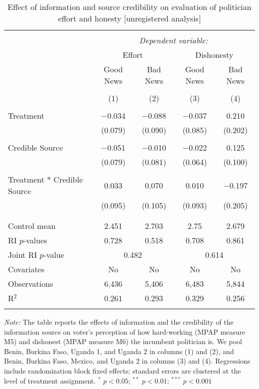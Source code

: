 
\begin{table}[!htbp] \centering 
  \caption{Effect of information and source credibility on evaluation of politician effort and honesty [unregistered analysis]} 
  \label{effort_honesty_credibility} 
\begin{tabular}{@{\extracolsep{1pt}}lcccc} 
\\[-1.8ex]\hline 
\hline \\[-1.8ex] 
 & \multicolumn{4}{c}{\textit{Dependent variable:}} \\ 
\cline{2-5} 
& \multicolumn{2}{c}{Effort}&\multicolumn{2}{c}{Dishonesty}\\
\cline{2-5}
 & Good News & Bad News & Good News & Bad News \\ 
\\[-1.8ex] & (1) & (2) & (3) & (4)\\ 
\hline \\[-1.8ex] 
 Treatment & $-$0.034 & $-$0.088 & $-$0.037 & 0.210 \\ 
  & (0.079) & (0.090) & (0.085) & (0.202) \\ 
  & & & & \\ 
 Credible Source & $-$0.051 & $-$0.010 & $-$0.022 & 0.125 \\ 
  & (0.079) & (0.081) & (0.064) & (0.100) \\ 
  & & & & \\ 
 Treatment * Credible Source & 0.033 & 0.070 & 0.010 & $-$0.197 \\ 
  & (0.095) & (0.105) & (0.093) & (0.205) \\ 
  & & & & \\ 
\hline \\[-1.8ex] 
Control mean & 2.451 & 2.703 & 2.75 & 2.679 \\ 
RI $p$-values & 0.728 & 0.518 & 0.708 & 0.861 \\ 
Joint RI $p$-value & \multicolumn{2}{c}{0.482} & \multicolumn{2}{c}{0.614} \\
Covariates & No & No & No & No \\ 
Observations & 6,436 & 5,406 & 6,483 & 5,844 \\ 
R$^{2}$ & 0.261 & 0.293 & 0.329 & 0.256 \\ 
\hline 
\hline \\[-1.8ex] 
\end{tabular} 
\begin{flushleft}\textit{Note:} The table reports the effects of information and the credibility of the information source on voter's perception of how hard-working (MPAP measure M5) and dishonest (MPAP measure M6) the incumbent politician is. We pool Benin, Burkina Faso, Uganda 1, and Uganda 2 in columns (1) and (2), and Benin, Burkina Faso, Mexico, and Uganda 2 in columns (3) and (4). Regressions include randomization block fixed effects; standard errors are clustered at the level of treatment assignment. $^*$ $p<0.05$; $^{**}$ $p<0.01$; $^{***}$ $p<0.001$ \end{flushleft}
\end{table} 
